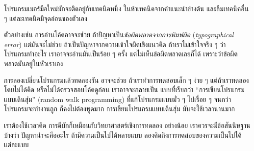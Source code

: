 
โปรแกรมเมอร์มือใหม่มักจะติดอยู่กับเทคนิคหนึ่ง ในห้าเทคนิคจากคำแนะนำข้างต้น และลืมเทคนิคอื่น ๆ
แต่ละเทคนิคมีจุดอ่อนของตัวเอง


ตัวอย่างเช่น การอ่านโค้ดอาจจะช่วย ถ้าปัญหาเป็น\textit{ข้อผิดพลาดจากการพิมพ์ผิด} (\textit{typographical error})
แต่มันจะไม่ช่วย ถ้าเป็นปัญหาจากความเข้าใจผิดเชิงแนวคิด
ถ้าเราไม่เข้าใจจริง ๆ ว่า โปรแกรมทำอะไร
เราอาจจะอ่านมันเป็นร้อย ๆ ครั้ง แต่ไม่เห็นข้อผิดพลาดเลยก็ได้
เพราะว่าข้อผิดพลาดมันอยู่ในหัวเราเอง


การลองเปลี่ยนโปรแกรมแล้วทดลองรัน อาจจะช่วย
ถ้าเราทำการทดสอบเล็ก ๆ ง่าย ๆ
แต่ถ้าเราทดลอง โดยไม่ได้คิด หรือไม่ได้ตรวจสอบโค้ดดูก่อน
เราอาจจะกลายเป็น แบบที่เรียกว่า ``การเขียนโปรแกรมแบบเดินสุ่ม'' (random walk programming)
ที่แก้โปรแกรมแบบมั่ว ๆ ไปเรื่อย ๆ จนกว่าโปรแกรมจะทำงานถูก
ก็คงไม่ต้องพูดมาก 
การเขียนโปรแกรมแบบเดินสุ่ม มันจะใช้เวลานานมาก


เราต้องใช้เวลาคิด
การดีบักก็เหมือนกับวิทยาศาสตร์เชิงการทดลอง
อย่างน้อย เราควรจะมีข้อสันนิษฐาน บ้างว่า ปัญหาน่าจะคืออะไร
ถ้ามีความเป็นไปได้หลายแบบ ลองคิดถึงการทดสอบของความเป็นไปได้แต่ละแบบ


